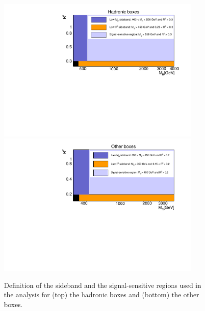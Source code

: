 \begin{figure}[ht!]
\centering
\includegraphics[width=0.9\textwidth]{figs/analysis8TeV/SidebandL_MultiJet.pdf}\\
\includegraphics[width=0.9\textwidth]{figs/analysis8TeV/SidebandL_Mu.pdf}
\caption{\label{fig:regions} Definition of the sideband and the
 signal-sensitive regions used in the analysis for (top) the hadronic
 boxes and (bottom) the other boxes.}
\end{figure}

